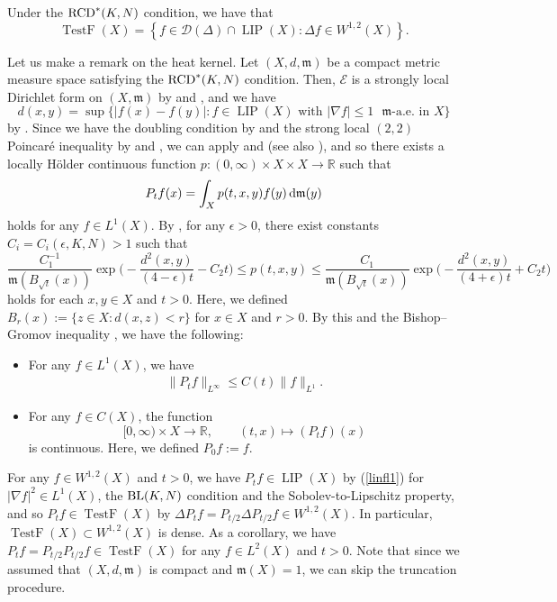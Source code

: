 \documentclass[10pt,a4paper]{amsart}
\numberwithin{equation}{section}
\theoremstyle{definition}
\newcommand{\LIP}{\operatorname{LIP}}
\newcommand{\TestF}{\operatorname{TestF}}
\newcommand{\R}{\mathbb{R}}
\newcommand{\mf}{\mathfrak{m}}
\newcommand{\RCD}{{\rm RCD}^\ast}
\newcommand{\BL}{{\rm BL}}
\newcommand{\D}{\mathcal{D}}
\begin{document}
Under the $\RCD(K,N)$ condition, we have that
\[
\TestF(X)=\left\{f\in\D(\Delta)\cap \LIP(X)\colon \Delta f\in W^{1,2}(X)\right\} .
\]

Let us make a remark on the heat kernel.
Let $(X,d,\mf)$ be a compact metric measure space satisfying the $\RCD(K,N)$ condition.
Then, $\mathcal{E}$ is a strongly local Dirichlet form on $(X,\mf)$ by \cite[Proposition~4.8]{AGS1} and \cite[Proposition~4.11]{AGS2}, and we have
\[
d(x,y)=\sup\{|f(x)-f(y)|\colon\text{$f\in \LIP(X)$ with $|\nabla f|\leq 1$ $\mf$-a.e.\ in $X$}\}
\]
by \cite[Theorem~3.9]{AGS3}.
Since we have the doubling condition by \cite[Corollary~2.4]{Stu} and the strong local $(2,2)$ Poincar\'{e} inequality \cite[Property (Ic)]{Stu3} by \cite[Theorem~1.1]{Raj} and \cite[Theorem~1]{HK}, %
we can apply \cite[Proposition~2.3]{Stu2} and \cite[Proposition~3.1]{Stu3} (see also \cite[Theorem~3.5]{Stu3}), and so there exists a locally H\"{o}lder continuous function $p\colon (0,\infty)\times X\times X\to\R$ such that
\[
P_t f (x)=\int_X p(t,x,y) f(y)\,{\rm d}\mf(y)
\]
holds for any $f\in L^1(X)$.
By \cite[Theorem~1.2]{JLZ}, for any $\epsilon>0$, there exist constants $C_i=C_i(\epsilon,K,N)>1$ such that
\[
\frac{C_1^{-1}}{\mf(B_{\sqrt{t}}(x))}\exp\bigg(\!{-}\frac{d^2(x,y)}{(4-\epsilon)t}-C_2 t\bigg)\leq
p(t,x,y)\leq \frac{C_1}{\mf(B_{\sqrt{t}}(x))}\exp\bigg(\!{-}\frac{d^2(x,y)}{(4+\epsilon)t}+C_2 t\bigg)
\]
holds for each $x,y\in X$ and $t>0$.
Here, we defined $B_r(x):=\{z\in X\colon d(x,z)<r\}$ for $x\in X$ and $r>0$.
By this and the Bishop--Gromov inequality \cite[Theorem~2.3]{Stu},
we have the following:
\begin{itemize}\itemsep=0pt
\item For any $f\in L^1(X)$, we have
\begin{gather}\label{linfl1}
\|P_t f\|_{L^\infty}\leq C(t)\|f\|_{L^1}.
\end{gather}
\item For any $f\in C(X)$, the function
\[
[0,\infty)\times X\to \R,\qquad (t,x)\mapsto (P_t f)(x)
\]
is continuous. Here, we defined $P_0 f:=f$.
\end{itemize}
For any $f\in W^{1,2}(X)$ and $t>0$, we have $P_t f\in \LIP(X)$ by (\ref{linfl1}) for $|\nabla f|^2\in L^1(X)$, the $\BL(K,N)$ condition and the Sobolev-to-Lipschitz property, and so $P_t f\in \TestF(X)$ by $\Delta P_t f=P_{t/2}\Delta P_{t/2} f\in W^{1,2}(X)$.
In particular, $\TestF(X)\subset W^{1,2}(X)$ is dense.
As a corollary, we have $P_t f=P_{t/2}P_{t/2}f\in \TestF(X)$ for any $f\in L^2(X)$ and $t>0$.
Note that since we assumed that $(X,d,\mf)$ is compact and $\mf(X)=1$, we can skip the truncation procedure.
\end{document}
